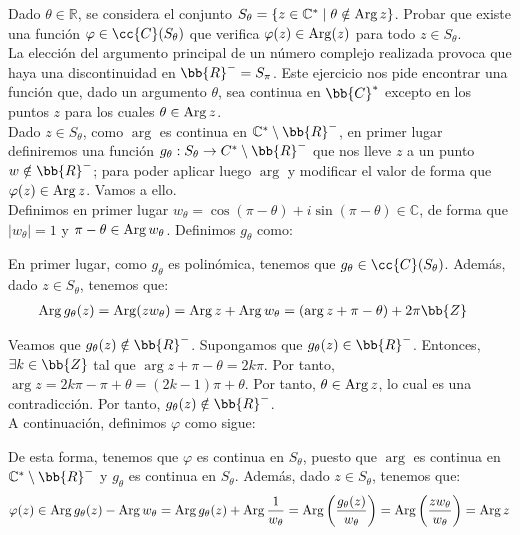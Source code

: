 \begin{ejercicio}\label{ej:2.2}
    Dado $\theta \in \mathbb{R}$, se considera el conjunto $S_\theta = \{z \in \mathbb{C}^\ast \mid \theta \notin \operatorname{Arg} z\}$. Probar que existe una función $\varphi \in \cc{C}(S_\theta)$ que verifica $\varphi(z) \in \operatorname{Arg} (z)$ para todo $z \in S_\theta$.\\

    La elección del argumento principal de un número complejo realizada provoca que haya una discontinuidad en $\bb{R}^-=S_{\pi}$. Este ejercicio nos pide encontrar una función que, dado un argumento $\theta$, sea continua en $\bb{C}^*$ excepto en los puntos $z$ para los cuales $\theta\in \operatorname{Arg} z$.\\

    Dado $z\in S_{\theta}$, como $\arg$ es continua en $\mathbb{C}^\ast\setminus \bb{R}^-$, en primer lugar definiremos una función $g_{\theta}:S_{\theta}\to C^{\ast}\setminus \bb{R}^-$ que nos lleve $z$ a un punto $w\notin \bb{R}^-$; para poder aplicar luego $\arg$ y modificar el valor de forma que $\varphi(z)\in \operatorname{Arg} z$. Vamos a ello.\\

    Definimos en primer lugar $w_\theta=\cos(\pi-\theta) + i\sin(\pi-\theta)\in \mathbb{C}$, de forma que $|w_\theta|=1$ y $\pi-\theta\in \operatorname{Arg} w_\theta$. Definimos $g_{\theta}$ como:

    En primer lugar, como $g_{\theta}$ es polinómica, tenemos que $g_\theta\in \cc{C}(S_{\theta})$. Además, dado $z\in S_{\theta}$, tenemos que:
    \begin{align*}
        \Arg g_{\theta}(z) &= \Arg(zw_\theta) = \Arg z + \Arg w_{\theta} = (\arg z + \pi-\theta)+2\pi\bb{Z}
    \end{align*}

    Veamos que $g_{\theta}(z)\notin \bb{R}^-$. Supongamos que $g_{\theta}(z)\in \bb{R}^-$. Entonces, $\exists k\in \bb{Z}$ tal que $\arg z + \pi-\theta = 2k\pi$. Por tanto, $\arg z = 2k\pi - \pi + \theta = (2k-1)\pi + \theta$. Por tanto, $\theta\in \operatorname{Arg} z$, lo cual es una contradicción. Por tanto, $g_{\theta}(z)\notin \bb{R}^-$.\\

    A continuación, definimos $\varphi$ como sigue:

    De esta forma, tenemos que $\varphi$ es continua en $S_{\theta}$, puesto que $\arg$ es continua en $\mathbb{C}^{\ast}\setminus \bb{R}^-$ y $g_{\theta}$ es continua en $S_{\theta}$. Además, dado $z\in S_{\theta}$, tenemos que:
    \begin{equation*}
        \varphi(z) \in \operatorname{Arg} g_{\theta}(z) - \operatorname{Arg} w_{\theta} = \operatorname{Arg} g_{\theta}(z) + \operatorname{Arg}\frac{1}{w_{\theta}} = \operatorname{Arg}\left(\frac{g_{\theta}(z)}{w_{\theta}}\right) = \operatorname{Arg}\left(\frac{zw_{\theta}}{w_{\theta}}\right) = \operatorname{Arg} z
    \end{equation*}

\end{ejercicio}

